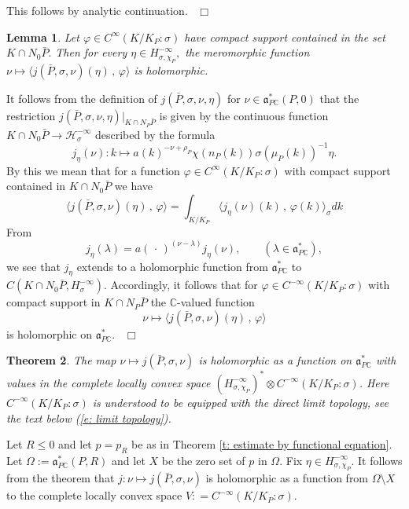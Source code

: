 \documentclass[12pt,a4paper]{article}
\newtheorem{Thm}{Theorem}
\newtheorem{Lemma}[Thm]{Lemma}
\newenvironment{thm}[0]{\begin{Thm}\noindent}%
{\end{Thm}}
\newenvironment{lemma}[0]{\begin{Lemma}\noindent}%
{\end{Lemma}}
\def\proof{\par\noindent{\it Proof.}{\ }{\ }}
\def\qed{~\hfill\hbox{$\Box$}\medbreak}
\def\qquad{\quad\quad}
\def\msy#1{{\mathbb #1}}
\def\C{{\msy C}}
\def\gf{\varphi}
\def\gl{\lambda}
\def\gs{\sigma}
\def\got#1{\mathfrak #1}
\def\fa{{\got a}}
\def\to{\rightarrow}
\def\inp#1#2{\langle#1\,,\,#2\rangle}
\def\iC{{\scriptscriptstyle \C}}
\def\cH{{\mathcal H}}
\numberwithin{Thm}{section}
\numberwithin{equation}{section}
\def\dotvar{\, \cdot\,}
\def\faPdc{{\fa_{P\iC}^*}}
\numberwithin{equation}{section}
\def\faPdc{\fa_{P\iC}^*}
\def\col{\!:\!}
\def\cchi{\chi}
\def\gsP{\gs}%
\begin{document}
\proof 
This follows by analytic continuation.
\qed

\begin{lemma} 
\label{l: restricted j holomorphic}
Let $\gf \in C^{\infty}(K/K_P:\gsP)$ have compact support contained in 
the set $K \cap N_0\bar P.$  Then for every $\eta \in H_{\gs,\cchi_P}^{-\infty},$ the 
meromorphic function $\nu \mapsto \inp{j(\bar P, \gs, \nu)(\eta)}{\gf}$ is holomorphic.
\end{lemma}

\proof
It follows from the definition
of $j(\bar P,\gs, \nu, \eta )$ for $\nu \in \faPdc(P,0)$ that the restriction $j(\bar P,\gs, \nu, \eta)|_{K\cap N_P \bar P}$ is given by the 
continuous function $K\cap N_0 \bar P  \to \cH_\gs^{-\infty}$ described by the formula
\begin{equation}
\label{e: defi j eta nu} 
j_\eta(\nu): k \mapsto a(k)^{-\nu + \rho_P}  \cchi(n_P(k)) \gs(\mu_P(k))^{-1}\eta.
\end{equation}
By this we mean that for a function $\gf \in C^{\infty}(K/K_P\col \gsP)$ 
with compact support contained in $K \cap N_0\bar P$ we have 
$$ 
\inp{j(\bar P, \gs, \nu)(\eta)}{\gf} = \int_{K/K_P} \inp{ j_\eta(\nu)(k)}{\gf(k)}_\gs dk
$$ 
From
$$ 
j_\eta(\gl) = a(\dotvar)^{(\nu-\gl)} j_\eta(\nu),\qquad (\gl \in \faPdc),
$$ 
we see that $j_\eta$ extends to a holomorphic function from $\faPdc$ to $C(K\cap N_0 \bar P, H_\gs^{-\infty}).$ 
Accordingly, it follows that for $\gf \in C^{-\infty}(K/K_P:\gsP)$ with compact support in 
$K \cap N_P\bar P$ the $\C$-valued function 
$$ 
\nu \mapsto \inp{j(\bar P, \gs, \nu)(\eta)}{\gf}
$$ 
is holomorphic on $\faPdc.$ 
\qed


\begin{thm}
\label{t: j is holomorphic}
The map $\nu \mapsto j(\bar P,\gs, \nu)$ is holomorphic as a function on $\faPdc$ with values in 
the complete locally convex space $(H_{\gs,\cchi_P}^{-\infty})^*\otimes C^{-\infty}(K/K_P: \gsP)$.
Here $C^{-\infty}(K/K_P:\gsP)$ is understood to be equipped with the direct limit topology, see
the text below (\ref{e: limit topology}).

\end{thm}


\proof 
Let $R \leq 0$ and let $p = p_R$ be as in Theorem \ref{t: estimate by functional equation}. 
Let $\Omega:= \faPdc(P, R)$ and let $X$ be the zero set of $p$ in $\Omega.$ Fix 
$\eta \in H_{\gs,\cchi_P}^{-\infty}.$ It follows from the theorem that 
$j: \nu \mapsto j(\bar P, \gs, \nu)$ is holomorphic as a function from $\Omega \setminus X$ 
to the complete locally convex space $V: = C^{-\infty}(K/K_P : \gsP).$ 
\end{document}
